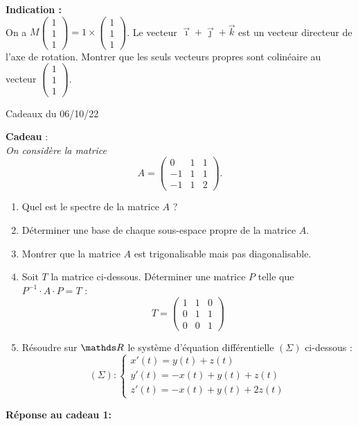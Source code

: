 \documentclass[a4paper]{article}
\begin{document}
	{\bfseries Indication :}\\
	On a $M \left( \substack{1\\1\\1} \right) = 1 \times \left( \substack{1\\1\\1} \right)$. Le vecteur $\vec{\imath}+\vec{\jmath}+\vec{k}$\/ est un vecteur directeur de l'axe de rotation. Montrer que les seuls vecteurs propres sont colinéaire au vecteur $\left( \substack{1\\1\\1} \right)$.
	\clearpage
	\centerline{\LARGE Cadeaux du 06/10/22}
	\bigskip
	\bigskip
	{\bf Cadeau} :\\
	\slshape
	On considère la matrice \[
		A = \begin{pmatrix}
			0&1&1\\
			-1&1&1\\
			-1&1&2
		\end{pmatrix}
	.\]
	\begin{enumerate}
		\item Quel est le spectre de la matrice $A$\/ ?
		\item Déterminer une base de chaque sous-espace propre de la matrice $A$.
		\item Montrer que la matrice $A$\/ est trigonalisable mais pas diagonalisable.
		\item Soit $T$\/ la matrice ci-dessous. Déterminer une matrice $P$\/ telle que $P^{-1} \cdot A \cdot P = T$ : \[
				T = \begin{pmatrix}
					1&1&0\\
					0&1&1\\
					0&0&1
				\end{pmatrix}
			\]
		\item Résoudre sur $\R$\/ le système d'équation différentielle $(\Sigma)$\/ ci-dessous : \[
				(\Sigma) : \begin{cases}
					x'(t) = y(t) + z(t)\\
					y'(t) = -x(t) + y(t) + z(t)\\
					z'(t) = -x(t) + y(t) + 2z(t)
				\end{cases}
			\]
	\end{enumerate}
	\upshape
	\bigskip
	\bigskip
	{\bf Réponse au cadeau 1:}\\
\end{document}
